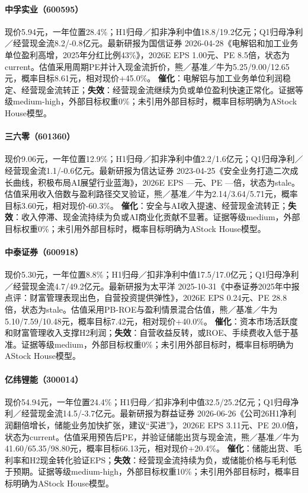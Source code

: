 \paragraph{中孚实业（600595）}
现价5.94元，一年位置28.4\%；H1归母／扣非净利中值18.8/19.2亿元；Q1归母净利／经营现金流8.2/-0.8亿元。最新研报为国信证券 2026-04-28《电解铝和加工业务单位盈利高增，2025年分红比例43\%》，2026E EPS 1.00元、PE 8.5倍，状态为current。估值采用周期PE并计入现金流折价，熊／基准／牛为5.25/9.00/12.65元，概率目标8.61元，相对现价+45.0\%。
\textbf{催化}：电解铝与加工业务单位利润稳定、经营现金流转正；\textbf{失效}：经营现金流继续为负或单位盈利快速正常化。证据等级medium-high，外部目标权重0\%；未引用外部目标时，概率目标明确为AStock House模型。

\paragraph{三六零（601360）}
现价9.06元，一年位置12.9\%；H1归母／扣非净利中值2.2/1.6亿元；Q1归母净利／经营现金流1.1/-0.6亿元。最新研报为信达证券 2023-04-25《安全业务打造二次成长曲线，积极布局AI展望行业蓝海》，2026E EPS ---元、PE ---倍，状态为stale。估值采用收入倍数与盈利路径交叉验证，熊／基准／牛为2.14/3.64/5.71元，概率目标3.60元，相对现价-60.3\%。
\textbf{催化}：安全与AI收入提速、经营现金流转正；\textbf{失效}：收入停滞、现金流持续为负或AI商业化贡献不显著。证据等级medium，外部目标权重0\%；未引用外部目标时，概率目标明确为AStock House模型。

\paragraph{中泰证券（600918）}
现价5.30元，一年位置8.8\%；H1归母／扣非净利中值17.5/17.0亿元；Q1归母净利／经营现金流4.7/49.2亿元。最新研报为太平洋 2025-10-31《中泰证券2025年中报点评：财富管理表现出色，自营投资提供弹性》，2026E EPS 0.24元、PE 28.8倍，状态为stale。估值采用PB-ROE与盈利情景混合估值，熊／基准／牛为5.10/7.59/10.48元，概率目标7.42元，相对现价+40.0\%。
\textbf{催化}：资本市场活跃度和财富管理收入支撑H2利润；\textbf{失效}：自营收益反转，或ROE、手续费收入低于基准。证据等级medium，外部目标权重0\%；未引用外部目标时，概率目标明确为AStock House模型。

\paragraph{亿纬锂能（300014）}
现价54.94元，一年位置24.4\%；H1归母／扣非净利中值32.5/25.2亿元；Q1归母净利／经营现金流14.5/-3.7亿元。最新研报为群益证券 2026-06-26《公司26H1净利润翻倍增长，储能业务加快扩张，建议“买进”》，2026E EPS 3.11元、PE 20.0倍，状态为current。估值采用预告后PE，并验证储能出货与现金流，熊／基准／牛为41.60/65.35/98.80元，概率目标66.13元，相对现价+20.4\%。
\textbf{催化}：储能出货、毛利率和H2现金转化验证EPS；\textbf{失效}：经营现金流持续为负，或储能价格与毛利低于预期。证据等级medium-high，外部目标权重10\%；未引用外部目标时，概率目标明确为AStock House模型。

